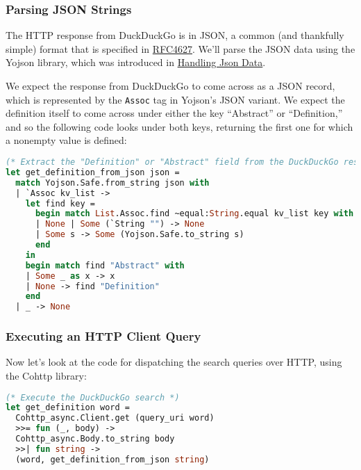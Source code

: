 \hypertarget{parsing-json-strings}{%
\subsubsection{Parsing JSON Strings}\label{parsing-json-strings}}

The HTTP response from DuckDuckGo is in JSON, a common (and thankfully
simple) format that is specified in
\href{http://www.ietf.org/rfc/rfc4627.txt}{RFC4627}. We'll parse the
JSON data using the Yojson library, which was introduced in
\href{json.html\#handling-json-data}{Handling Json Data}.

We expect the response from DuckDuckGo to come across as a JSON record,
which is represented by the \passthrough{\lstinline!Assoc!} tag in
Yojson's JSON variant. We expect the definition itself to come across
under either the key ``Abstract'' or ``Definition,'' and so the
following code looks under both keys, returning the first one for which
a nonempty value is defined:

\begin{lstlisting}[language=Caml]
(* Extract the "Definition" or "Abstract" field from the DuckDuckGo results *)
let get_definition_from_json json =
  match Yojson.Safe.from_string json with
  | `Assoc kv_list ->
    let find key =
      begin match List.Assoc.find ~equal:String.equal kv_list key with
      | None | Some (`String "") -> None
      | Some s -> Some (Yojson.Safe.to_string s)
      end
    in
    begin match find "Abstract" with
    | Some _ as x -> x
    | None -> find "Definition"
    end
  | _ -> None
\end{lstlisting}

\hypertarget{executing-an-http-client-query}{%
\subsubsection{Executing an HTTP Client
Query}\label{executing-an-http-client-query}}

Now let's look at the code for dispatching the search queries over HTTP,
using the Cohttp library: 

\begin{lstlisting}[language=Caml]
(* Execute the DuckDuckGo search *)
let get_definition word =
  Cohttp_async.Client.get (query_uri word)
  >>= fun (_, body) ->
  Cohttp_async.Body.to_string body
  >>| fun string ->
  (word, get_definition_from_json string)
\end{lstlisting}

